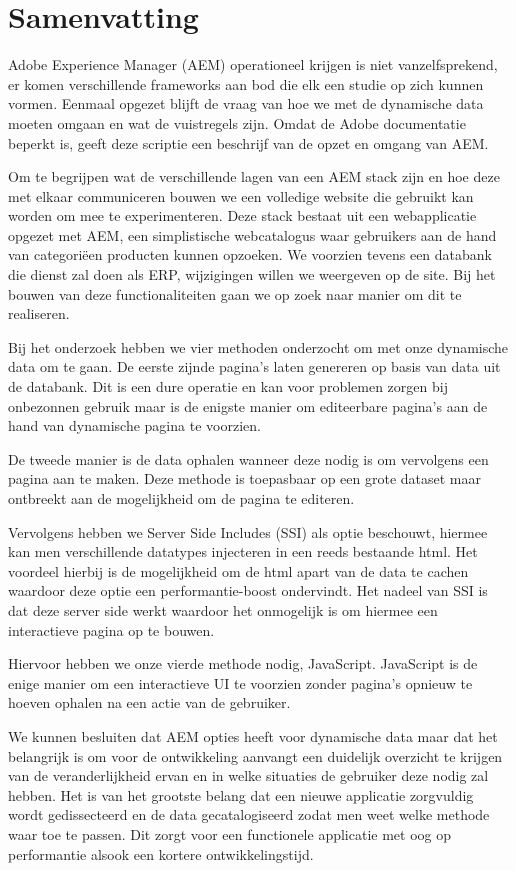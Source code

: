 \chapter{Samenvatting}
\label{ch:samenvatting}
Adobe Experience Manager (AEM) operationeel krijgen is niet vanzelfsprekend, er komen verschillende frameworks aan bod die elk een studie op zich kunnen vormen. Eenmaal opgezet blijft de vraag van hoe we met de dynamische data moeten omgaan en wat de vuistregels zijn. Omdat de Adobe documentatie beperkt is, geeft deze scriptie een beschrijf van de opzet en omgang van AEM.
\par
Om te begrijpen wat de verschillende lagen van een AEM stack zijn en hoe deze met elkaar communiceren bouwen we een volledige website die gebruikt kan worden om mee te experimenteren. Deze stack bestaat uit een webapplicatie opgezet met AEM, een simplistische webcatalogus waar gebruikers aan de hand van categori\"een producten kunnen opzoeken. We voorzien tevens een databank die dienst zal doen als ERP, wijzigingen willen we weergeven op de site. Bij het bouwen van deze functionaliteiten gaan we op zoek naar manier om dit te realiseren.
\par
Bij het onderzoek hebben we vier methoden onderzocht om met onze dynamische data om te gaan. De eerste zijnde pagina's laten genereren op basis van data uit de databank. Dit is een dure operatie en kan voor problemen zorgen bij onbezonnen gebruik maar is de enigste manier om editeerbare pagina's aan de hand van dynamische pagina te voorzien. 
\par
De tweede manier is de data ophalen wanneer deze nodig is om vervolgens een pagina aan te maken. Deze methode is toepasbaar op een grote dataset maar ontbreekt aan de mogelijkheid om de pagina te editeren.
\par
Vervolgens hebben we Server Side Includes (SSI) als optie beschouwt, hiermee kan men verschillende datatypes injecteren in een reeds bestaande html. Het voordeel hierbij is de mogelijkheid om de html apart van de data te cachen waardoor deze optie een performantie-boost ondervindt. Het nadeel van SSI is dat deze server side werkt waardoor het onmogelijk is om hiermee een interactieve pagina op te bouwen. 
\par
Hiervoor hebben we onze vierde methode nodig, JavaScript. JavaScript is de enige manier om een interactieve UI te voorzien zonder pagina's opnieuw te hoeven ophalen na een actie van de gebruiker.
\par
We kunnen besluiten dat AEM opties heeft voor dynamische data maar dat het belangrijk is om voor de ontwikkeling aanvangt een duidelijk overzicht te krijgen van de veranderlijkheid ervan en in welke situaties de gebruiker deze nodig zal hebben. Het is van het grootste belang dat een nieuwe applicatie zorgvuldig wordt gedissecteerd en de data gecatalogiseerd zodat men weet welke methode waar toe te passen. Dit zorgt voor een functionele applicatie met oog op performantie alsook een kortere ontwikkelingstijd.
